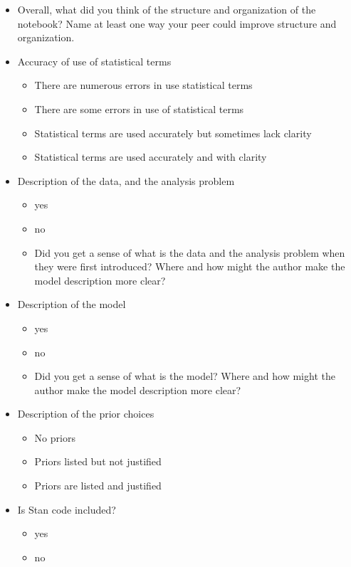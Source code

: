 \documentclass[a4paper,11pt]{article}
\begin{document}
\begin{itemize}
\item Overall, what did you think of the structure and organization of the
notebook? Name at least one way your peer could improve structure and
organization.

\item Accuracy of use of statistical terms
  \begin{itemize}
  \item There are numerous errors in use statistical terms
  \item There are some errors in use of statistical terms
  \item Statistical terms are used accurately but sometimes lack clarity
  \item Statistical terms are used accurately and with clarity
  \end{itemize}
  
\item  Description of the data, and the analysis problem
  \begin{itemize}
  \item yes
  \item no
  \item Did you get a sense of what is the data and the analysis problem when they were first introduced? Where and how might the author make the model description more clear?
\end{itemize}

\item Description of the model
  \begin{itemize}
  \item yes
  \item no
  \item Did you get a sense of what is the model? Where and 
  how might the author make the model description more clear?
\end{itemize}

\item Description of the prior choices
  \begin{itemize}
  \item No priors
  \item Priors listed but not justified
  \item Priors are listed and justified
  \end{itemize}
  
\item Is Stan code included?
  \begin{itemize}
  \item yes
  \item no
  \end{itemize}


\end{itemize}
\end{document}
